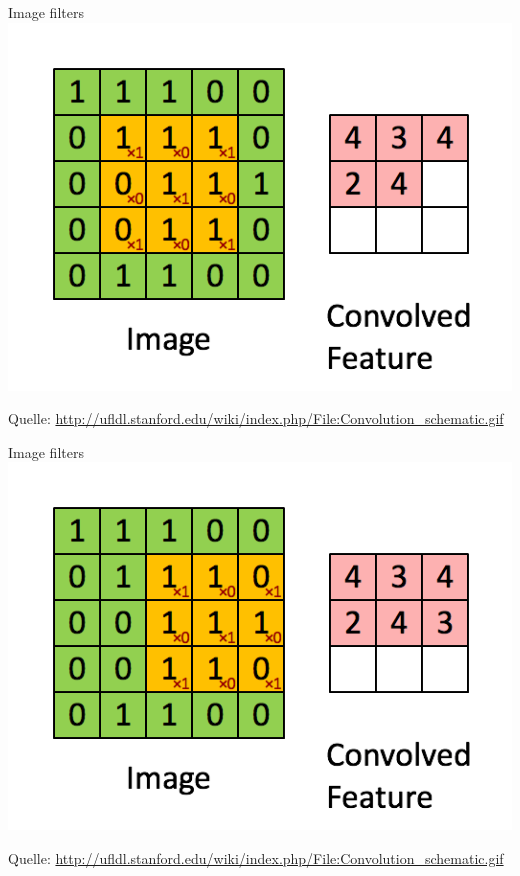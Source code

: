 \begin{frame}{Image filters}
    \includegraphics[width=\textwidth, height=0.8\textheight, keepaspectratio]{../presentation-images/image-filter-4.png}

    Quelle: \href{http://ufldl.stanford.edu/wiki/index.php/File:Convolution_schematic.gif}{http://ufldl.stanford.edu/wiki/index.php/File:Convolution\_schematic.gif}
\end{frame}

\begin{frame}{Image filters}
    \includegraphics[width=\textwidth, height=0.8\textheight, keepaspectratio]{../presentation-images/image-filter-5.png}

    Quelle: \href{http://ufldl.stanford.edu/wiki/index.php/File:Convolution_schematic.gif}{http://ufldl.stanford.edu/wiki/index.php/File:Convolution\_schematic.gif}
\end{frame}

